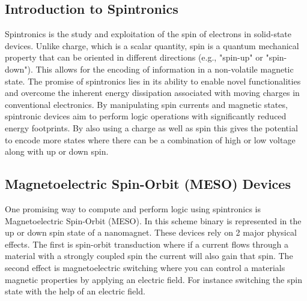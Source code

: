 \documentclass[sigconf]{acmart}
\begin{document}
\subsection{Introduction to Spintronics}
Spintronics is the study and exploitation of the spin 
of electrons in solid-state devices. Unlike charge, which is a 
scalar quantity, spin is a quantum mechanical property that can 
be oriented in different directions (e.g., "spin-up" or "spin-down").
This allows for the encoding of information in a non-volatile magnetic
state. The promise of spintronics lies in its ability to enable 
novel functionalities and overcome the inherent energy dissipation 
associated with moving charges in conventional electronics. By manipulating 
spin currents and magnetic states, spintronic devices aim to perform logic 
operations with significantly reduced energy footprints. 
By also using a charge as well as spin this gives the potential to encode more 
states where there can be a combination of high or low voltage along 
with up or down spin. 


\subsection{Magnetoelectric Spin-Orbit (MESO) Devices} 
One promising way to compute and perform logic using spintronics is 
Magnetoelectric Spin-Orbit (MESO). In this scheme binary is represented 
in the up or down spin state of a nanomagnet. These devices rely 
on 2 major physical effects. The first is spin-orbit transduction where 
if a current flows through a material with a strongly coupled spin 
the current will also gain that spin. The second effect is magnetoelectric 
switching where you can control a materials magnetic properties by applying 
an electric field. For instance switching the spin state with the help of 
an electric field.
\end{document}
